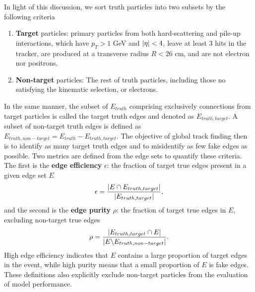 In light of this discussion, we sort truth particles into two subsets by the following criteria
\begin{enumerate}
    \item \textbf{Target} particles: primary particles from both hard-scattering and pile-up interactions, which have $p_T>1$ GeV and $\abs{\eta}<4$, leave at least 3 hits in the tracker, are produced at a transverse radius $R<26$ cm, and are not electron nor positrons.
    \item \textbf{Non-target} particles: The rest of truth particles, including those no satisfying the kinematic selection, or electrons.
\end{enumerate}
In the same manner, the subset of $E_{truth}$ comprising exclusively connections from target particles is called the target truth edges and denoted as $E_{truth,target}$. 
A subset of non-target truth edges is defined as $E_{truth, non-target} = E_{truth} - E_{truth,target}$. 
The objective of global track finding then is to identify as many target truth edges and to misidentify as few fake edges as possible.
Two metrics are defined from the edge sets to quantify these criteria.
The first is the \textbf{edge efficiency} $\epsilon$: the fraction of target true edges present in a given edge set $E$
\begin{equation}
\label{eq:9.2}
\epsilon = \frac{\abs{E \cap E_{truth,target}  }} {\abs{E_{truth, target}}},
\end{equation}
and the second is the \textbf{edge purity} $\rho$: the fraction of target true edges in $E$, excluding non-target true edges
\begin{equation}
\label{eq:9.3}
\rho = \frac{\abs{E_{truth,target} \cap E  }} {\abs{ E \backslash E_{truth, non-target} } } .
\end{equation}
High edge efficiency indicates that $E$ contains a large proportion of target edges in the event, while high purity means that a small proportion of $E$ is fake edges.
These definitions also explicitly exclude non-target particles from the evaluation of model performance.

